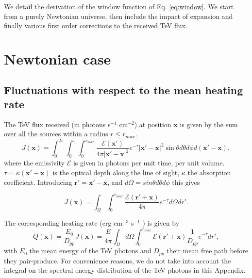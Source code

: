 \documentclass[twocolumns]{emulateapj}
\begin{document}
\appendix

We detail the derivation of the window function of Eq. \ref{eq:window}. We start from a purely Newtonian universe, then include the impact of expansion and finally various first order corrections to the received TeV flux.
\section {Newtonian case}\label{sec:windon_newt}

\subsection {Fluctuations with respect to the mean heating rate}

The TeV flux received (in photons s$^{-1}$ cm$^{-2}$) at position $\mathbf{x}$ is given by the sum over all the sources within a radius $r\leqslant r_{max}$.
\begin{equation}
  \label{eq:flux_recu0}
  J(\mathbf{x})=\int_{0}^{2\pi}\int_{0}^{\pi}\int_0^{r_{max}}   \frac{\mathcal{E}(\mathbf{x}') }{4\pi |\mathbf{x}'-\mathbf{x}|^2} e^{-\tau} |\mathbf{x}'-\mathbf{x}|^2 \sin\theta d\theta d\phi d(\mathbf{x}'-\mathbf{x}),
\end{equation}
where the emissivity $\mathcal{E}$ is given in photons per unit time, per unit volume. $\tau=\kappa (\mathbf{x}'-\mathbf{x})$ is the optical depth along the line of sight, $\kappa$ the absorption coefficient.
Introducing $\mathbf{r'}=\mathbf{x}'-\mathbf{x}$, and $d\Omega=sin\theta d\theta d\phi$ this gives


\begin{equation}
  \label{eq:flux_recu}
  J(\mathbf{x})=\int_{\Omega}\int_0^{r_{max}}   \frac{\mathcal{E}(\mathbf{r}'+\mathbf{x}) }{4\pi } e^{-\tau} d\Omega dr'.
\end{equation}

The corresponding heating rate (erg cm$^{-3}$ s$^{-1}$ ) is given by 
\begin{equation}
  \label{eq:heating_rate0}
  \dot{Q}(\mathbf{x})=\frac{E_0}{D_{pp}}J(\mathbf{x}) =\frac{E}{4\pi}   \int_{\Omega}d\Omega\int_0^{r_{max}}   \mathcal{E}(\mathbf{r}'+\mathbf{x}) \frac{1}{D_{pp}}  e^{-\tau} dr' ,
\end{equation}
with $E_0$ the mean energy of the TeV photons and $D_{pp}$ their mean free path  before they pair-produce. For convenience reasons,  we  do not take into account the integral on the spectral energy distribution of the TeV photons in this Appendix. 
\end{document}

